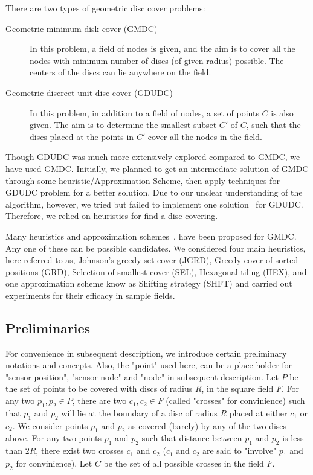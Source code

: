 There are two types of geometric disc cover problems:

\begin{description}
\item[Geometric minimum disk cover (GMDC)] In this problem, a field of nodes is given, and the aim is to cover all the nodes with minimum number of discs (of given radius) possible. The centers of the discs can lie anywhere on the field.
\item[Geometric discreet unit disc cover (GDUDC)] In this problem, in addition to a field of nodes, a set of points $C$ is also given. The aim is to determine the smallest subset $C'$ of $C$, such that the discs placed at the points in $C'$ cover all the nodes in the field.
\end{description}

Though GDUDC was much more extensively explored compared to GMDC, we have 
used GMDC. Initially, we planned to get an intermediate solution of GMDC through some heuristic/Approximation Scheme, then apply techniques for GDUDC problem for a better solution. Due to our unclear understanding of the algorithm, however, we tried but failed to implement one solution~\cite{carmi} for GDUDC. Therefore, we relied on heuristics for find a disc covering.

Many heuristics and approximation schemes~\cite{shifting}, \cite{appScheme} have been proposed for GMDC. Any one of these can be possible candidates. We considered four main heuristics, here referred to as, Johnson's greedy set cover (JGRD), Greedy cover of sorted positions (GRD), Selection of smallest cover (SEL), Hexagonal tiling (HEX), and one approximation scheme know as Shifting strategy (SHFT) and carried out experiments for their efficacy in sample fields. 


\subsection{Preliminaries}\label{subsec:prelim}

For convenience in subsequent description, we introduce certain preliminary
notations and concepts. Also, the "point" used here, can be a place holder for "sensor position", "sensor node" and "node" in subsequent description. Let $P$ be the set of points to be covered with discs of radius $R$, in the square field $F$. For any two $p_1, p_2 \in P$, there are two $c_1,c_2 \in F$ (called "crosses" for convinience) such that $p_1$ and $p_2$ will lie at the boundary of a disc of radius $R$ placed at either $c_1$ or $c_2$. We consider points $p_1$ and $p_2$ as covered (barely) by any of the two discs above. For any two points $p_1$ and $p_2$ such that distance between $p_1$ and $p_2$ is less than $2R$, there exist two crosses $c_1$ and $c_2$ ($c_1$ and $c_2$ are said to "involve" $p_1$ and $p_2$ for convinience). Let $C$ be the set of all possible crosses in the field $F$.

